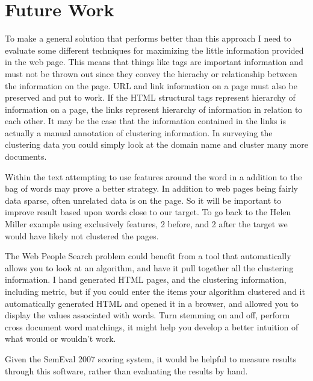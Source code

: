 \documentclass[12pt,twoside,letterpaper]{article}
\begin{document}
\section{Future Work}
To make a general solution that performs better than this approach I need to evaluate some different techniques for maximizing the little information provided in the web page. This means that things like tags are important information and must not be thrown out since they convey the hierachy or relationship between the information on the page. URL and link information on a page must also be preserved and put to work. If the HTML structural tags represent hierarchy of information on a page, the links represent hierarchy of information in relation to each other. It may be the case that the information contained in the links is actually a manual annotation of clustering information. In surveying the clustering data you could simply look at the domain name  and cluster many more documents.

Within the text attempting to use features around the word in a addition to the bag of words may prove a better strategy. In addition to web pages being fairly data sparse, often unrelated data is on the page. So it will be important to improve result based upon words close to our target. To go back to the Helen Miller example using exclusively features, 2 before, and 2 after the target we would have likely not clustered the pages.

The Web People Search problem could benefit from a tool that automatically allows you to look at an algorithm, and have it pull together all the clustering information. I hand generated HTML pages, and the clustering information, including metric, but if you could enter the items your algorithm clustered and it automatically generated HTML and opened it in a browser, and allowed you to display the values associated with words. Turn stemming on and off, perform cross document word matchings, it might help you develop a better intuition of what would or wouldn't work.

Given the SemEval 2007 scoring system, it would be helpful to measure results through this software, rather than evaluating the results by hand.
\end{document}
